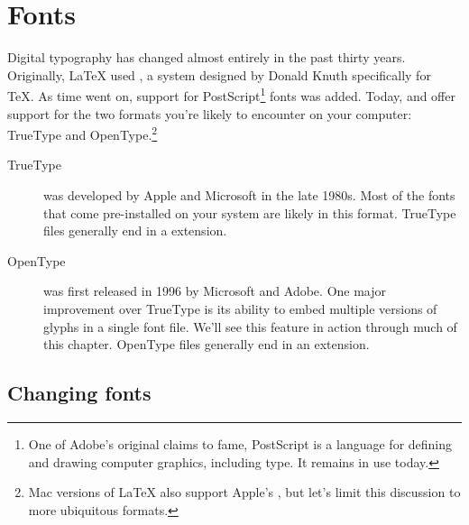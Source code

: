 \chapter{Fonts}
\label{fonts}

Digital typography has changed almost entirely in the past thirty years.
Originally, \LaTeX{} used \MF,
a system designed by Donald Knuth specifically for \TeX{}.
As time went on, support for PostScript\footnote{One of
Adobe's original claims to fame,
PostScript is a language for defining and drawing computer graphics,
including type. It remains in use today.} fonts was added.
Today, \LuaLaTeX{} and \XeLaTeX{} offer support for the two formats you're
likely to encounter on your computer:
TrueType and OpenType.\punckern\footnote{Mac versions of \LaTeX{} also support
Apple's , but let's limit this discussion to
more ubiquitous formats.}

\begin{description}
\item[TrueType] was developed by Apple and Microsoft in the late 1980s.
    Most of the fonts that come pre-installed on your system are likely
    in this format.
    TrueType files generally end in a  extension.
\item[OpenType] was first released in 1996 by Microsoft and Adobe.
    One major improvement over TrueType is its ability to embed
    multiple versions of glyphs in a single font file.
    We'll see this feature in action through much of this chapter.
    OpenType files generally end in an  extension.
\end{description}

\section{Changing fonts}

